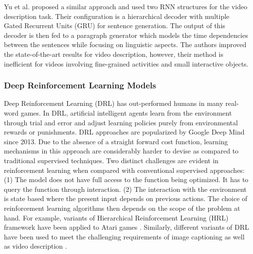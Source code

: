 \documentclass[10pt,journal,compsoc]{IEEEtran}
\begin{document}
Yu et al. \cite{yu2016video} proposed a similar approach and used two RNN structures for the video description task. Their configuration is a hierarchical decoder with multiple Gated Recurrent Units (GRU) for sentence generation. The output of this decoder is then fed to a paragraph generator which models the time dependencies between the sentences while focusing on linguistic aspects. The authors improved the state-of-the-art results for video description, however, their method is inefficient for videos involving fine-grained activities and small interactive objects. 

\subsubsection{Deep Reinforcement Learning Models}
Deep Reinforcement Learning (DRL) has out-performed humans in many real-word games. In DRL, artificial intelligent agents learn from the environment through trial and error and adjust learning policies purely from environmental rewards or punishments. DRL approaches are popularized by Google Deep Mind~\cite{mnih2015human, mnih2013playing} since 2013. Due to the absence of a straight forward cost function, learning mechanisms in this approach are considerably harder to devise as compared to traditional supervised techniques. Two distinct challenges are evident in reinforcement learning when compared with conventional supervised approaches: (1) The model does not have full access to the function being optimized. It has to query the function through interaction. (2) The interaction with the environment is state based where the present input depends on previous actions. 
The choice of reinforcement learning algorithms then depends on the scope of the problem at hand. For example, variants of Hierarchical Reinforcement Learning (HRL) framework have been applied to Atari games \cite{kulkarni2016hierarchical,vezhnevets2017feudal}. Similarly, different variants of DRL have been used to meet  the challenging requirements of image captioning \cite{ren2017deep} as well as video description \cite{pasunuru2017reinforced, wang2017video, li2018end, phan2017consensus, chen2018less}. 
\end{document}
